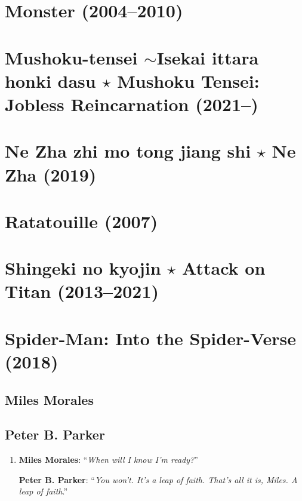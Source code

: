 \documentclass{book}
\numberwithin{equation}{section}
\begin{document}

\chapter{Monster (2004--2010)}


\chapter{Mushoku-tensei $\sim$Isekai ittara honki dasu $\star$ Mushoku Tensei: Jobless Reincarnation (2021--)}


\chapter{Ne Zha zhi mo tong jiang shi $\star$ Ne Zha (2019)}


\chapter{Ratatouille (2007)}


\chapter{Shingeki no kyojin $\star$ Attack on Titan (2013--2021)}


\chapter{Spider-Man: Into the Spider-Verse (2018)}

\section{Miles Morales}

\section{Peter B. Parker}
\begin{enumerate}
    \item \textbf{Miles Morales}: ``\textit{When will I know I'm ready?}''
    
    \textbf{Peter B. Parker}: ``\textit{You won't. It's a leap of faith. That's all it is, Miles. A leap of faith}.''
\end{enumerate}
\end{document}
